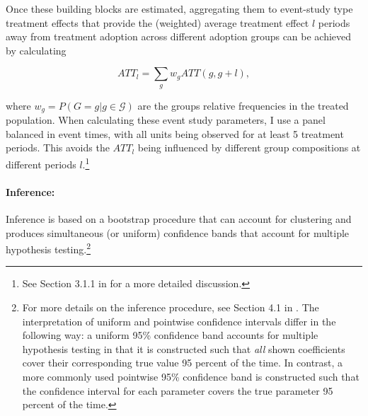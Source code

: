 Once these building blocks are estimated, aggregating them to event-study type treatment effects that provide the (weighted)
average treatment effect $l$ periods away from treatment adoption across
different adoption groups can be achieved by calculating

\begin{equation}
    \label{eq:att_es}
    ATT_l = \sum_g w_gATT(g,g+l),
\end{equation}

\noindent where $w_g = P(G = g | g \in \mathcal{G})$ are the groups relative frequencies in the
treated population. When calculating these event study parameters, I use a
panel balanced in event times, with all units being observed for at least 5
treatment periods. This avoids the $ATT_l$ being influenced by different
group compositions at different periods $l$.\footnote{See Section 3.1.1 in
\citet{callaway2021difference} for a more detailed discussion.}


\paragraph{Inference:}%
\label{par:inference_}

Inference is based on a bootstrap procedure that can account for clustering
and produces simultaneous (or uniform) confidence bands that account for
multiple hypothesis testing.\footnote{For more details on the inference
    procedure, see Section 4.1 in \citet{callaway2021difference}. The
    interpretation of uniform and pointwise confidence intervals differ in the
    following way: a uniform 95\% confidence band accounts for multiple
    hypothesis testing in that it is constructed such that \textit{all} shown
    coefficients cover their corresponding true value 95 percent of the time.
    In contrast, a more commonly used pointwise 95\% confidence band is
    constructed such that the confidence interval for each parameter covers the
true parameter 95 percent of the time.} 





